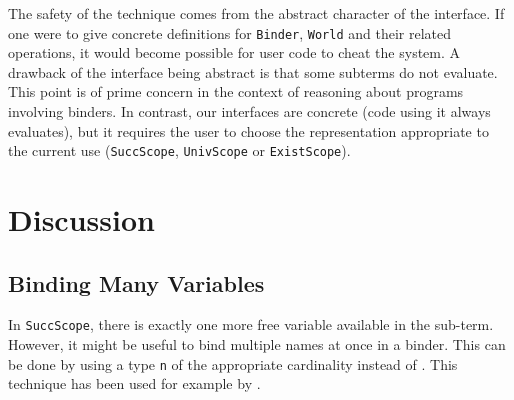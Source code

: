 \documentclass[9pt,preprint,authoryear]{sigplanconf}
\begin{document}
%
The safety of the technique comes from the abstract character of the
    interface. If one were to give concrete definitions for \textcolor[rgb]{0,0,0.80}{\texttt{Binder}},
    \textcolor[rgb]{0,0,0.80}{\texttt{World}} and their related operations, it would become possible for user
    code to cheat the system.
    A drawback of the interface being abstract is that some subterms
    do not evaluate. This point is of prime concern in the context of
    reasoning about programs involving binders.
    In contrast, our interfaces are concrete (code using it
    always evaluates), but it requires the user to choose the
    representation appropriate to the current use (\textcolor[rgb]{0,0,0.80}{\texttt{SuccScope}},
    \textcolor[rgb]{0,0,0.80}{\texttt{UnivScope}} or \textcolor[rgb]{0,0,0.80}{\texttt{ExistScope}}).%


\section{Discussion\label{discussion}}

\subsection{Binding Many Variables}

%
    In \textcolor[rgb]{0,0,0.80}{\texttt{SuccScope}}, there is exactly one more free variable available in the sub-term.
    However, it might be useful to bind multiple names at once in a binder. This can 
    be done by using a type \textcolor[rgb]{0,0,0.80}{\texttt{n}} of the appropriate cardinality instead of \textcolor[cmyk]{0,0.65,0.99,0}{\texttt{\makebox[1.22ex][l]{$ {(} $}}}\textcolor[cmyk]{0,0.65,0.99,0}{\texttt{\makebox[1.22ex][r]{$ {)} $}}}.
    This technique has been used for example by \citet{bound-kmett-12}.%


{\nopagebreak }
\end{document}
